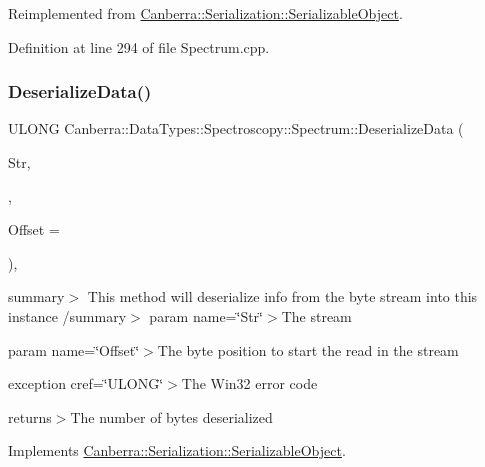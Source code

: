 Reimplemented from \hyperlink{class_canberra_1_1_serialization_1_1_serializable_object}{Canberra\+::\+Serialization\+::\+Serializable\+Object}.



Definition at line 294 of file Spectrum.\+cpp.

\mbox{\label{class_canberra_1_1_data_types_1_1_spectroscopy_1_1_spectrum_ae241fce6dd51ef5d18cbc7197176c08e_ae241fce6dd51ef5d18cbc7197176c08e}} 
\subsubsection{\texorpdfstring{Deserialize\+Data()}{DeserializeData()}}
{\footnotesize\ttfamily U\+L\+O\+NG Canberra\+::\+Data\+Types\+::\+Spectroscopy\+::\+Spectrum\+::\+Deserialize\+Data (\begin{DoxyParamCaption}\item[{\hyperlink{class_canberra_1_1_utility_1_1_core_1_1_byte_stream}{Canberra\+::\+Utility\+::\+Core\+::\+Byte\+Stream} \&}]{Str,  }\item[{const \hyperlink{class_canberra_1_1_serialization_1_1_meta_data}{Canberra\+::\+Serialization\+::\+Meta\+Data} \&}]{,  }\item[{const L\+O\+NG}]{Offset = {} }\end{DoxyParamCaption})\hspace{0.3cm}{\ttfamily [protected]}, {\ttfamily [virtual]}}

summary$>$ This method will deserialize info from the byte stream into this instance /summary$>$ param name=\char`\"{}\+Str\char`\"{}$>$The stream

param name=\char`\"{}\+Offset\char`\"{}$>$The byte position to start the read in the stream

exception cref=\char`\"{}\+U\+L\+O\+N\+G\char`\"{}$>$The Win32 error code

returns$>$The number of bytes deserialized

Implements \hyperlink{class_canberra_1_1_serialization_1_1_serializable_object}{Canberra\+::\+Serialization\+::\+Serializable\+Object}.



